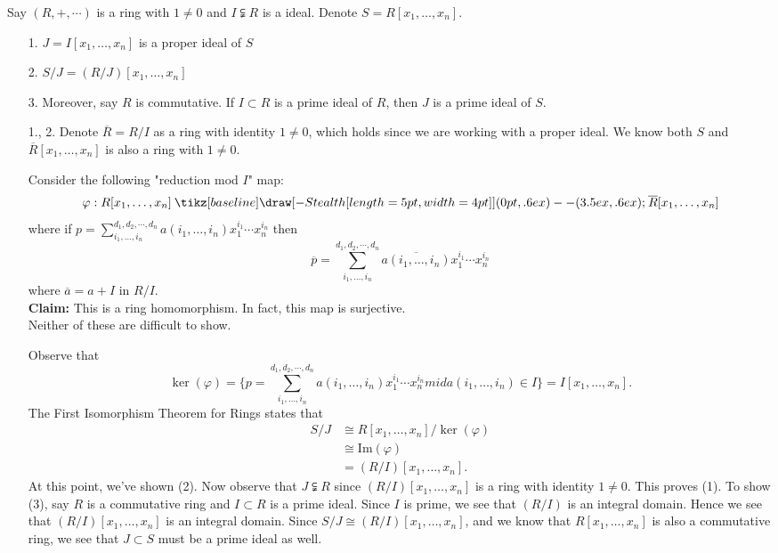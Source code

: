 \documentclass[12pt,letterpaper]{algebra_book}
\renewcommand{\to}{\mathbin{\tikz[baseline] \draw[-{Stealth[length=5pt,width=4pt]}] (0pt,.6ex) -- (3.5ex,.6ex);}}
\newcommand{\im}{\mbox{Im}}
\renewcommand{\phi}{\varphi}
\theoremstyle{definition}
\begin{document}
\begin{proposition}
    Say $(R, +, \cdots)$ is a ring with $1 \ne 0$ and $I
    \subsetneqq R$ is a ideal. Denote $S
    = R[x_1, \dots, x_n]$.
    \begin{itemize}
        \item[1.] $J = I[x_1, \dots, x_n]$ is a proper ideal of $S$
        \item[2.] $S/J = (R/J)[x_1, \dots, x_n]$ 
        \item[3.] Moreover, say $R$ is commutative. If $I \subset
        R$ is a prime ideal of $R$, then $J$ is a prime ideal of
        $S$. 
    \end{itemize}
\end{proposition}

\begin{prf} 
    \begin{itemize}
        \item[1., 2.] Denote $\overline{R} = R/I$ as a ring  with
        identity $1 \ne 0$, which holds since  we are working with
        a proper ideal. We know both $S$ and $\overline{R}[x_1,
        \dots, x_n]$ is also a ring with $1 \ne 0$. 

        Consider the following "reduction mod $I$" map:
        \[
            \phi: R[x_1,\dots, x_n] \to \overline{R}[x_1,\dots, x_n]
        \]
        where if $\displaystyle p = \sum_{i_1, \dots, i_n}^{d_1, d_2,
        \cdots, d_n}a(i_1, \dots, i_n)x_1^{i_1}\cdots x_n^{i_n}$
        then 
        \[
            \overline{p} = \sum_{i_1, \dots, i_n}^{d_1, d_2, \cdots, d_n}\overline{a(i_1, \dots, i_n)}x_1^{i_1}\cdots x_n^{i_n}
        \]
        where $\overline{a} = a + I$ in $R/I$. \\
        \textbf{Claim:} This is a ring homomorphism. In fact, this
        map is surjective. 
        \\
        Neither of these are difficult to show. 

        Observe that 
        \[
            \ker(\phi) = \Big\{p = \sum_{i_1, \dots, i_n}^{d_1, d_2,
            \cdots, d_n}a(i_1, \dots, i_n)x_1^{i_1}\cdots x_n^{i_n} mid a(i_1, \dots, i_n)\in I \Big\}
            = I[x_1, \dots, x_n].
        \]
        The First Isomorphism Theorem for Rings states that 
        \begin{align*}
            S/J &\cong R[x_1, \dots, x_n]/\ker(\phi)\\
            &\cong \im(\phi)\\
            &= (R/I)[x_1, \dots, x_n].
        \end{align*}
        At this point, we've shown (2). Now observe that $J
        \subsetneqq R$ since $(R/I)[x_1, \dots, x_n]$ is a ring
        with identity $1 \ne 0$. This proves (1). To show (3), say
        $R$ is a commutative ring and $I \subset R$ is a prime
        ideal. Since $I$ is prime, we see that $(R/I)$ is an
        integral domain. Hence we  see that $(R/I)[x_1, \dots,
        x_n]$ is an integral domain. Since $S/J \cong (R/I)[x_1, \dots,
        x_n]$, and  we know that $R[x_1, \dots, x_n]$ is also a
        commutative ring, we see  that $J \subset S$ must be a
        prime ideal as well. 



\end{itemize}
\end{prf}
\end{document}
